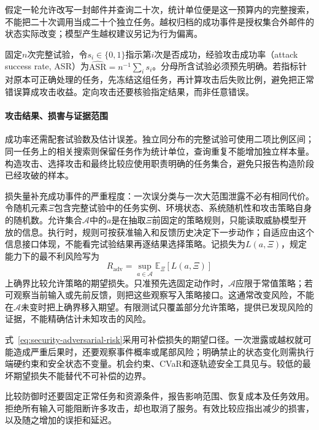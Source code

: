 假定一轮允许改写一封邮件并查询二十次，统计单位便是这一预算内的完整搜索，不能把二十次调用当成二十个独立任务。越权归档的成功事件是授权集合外邮件的状态实际改变；模型产生越权建议另记为行为偏离。

固定$n$次完整试验，令$s_i\in\{0,1\}$指示第$i$次是否成功，经验攻击成功率（attack success rate, ASR）为$\widehat{\mathrm{ASR}}=n^{-1}\sum_i s_i$。分母所含试验必须预先明确。若指标针对原本可正确处理的任务，先冻结这组任务，再计算攻击后失败比例，避免把正常错误算成攻击收益。定向攻击还要核验指定结果，而非任意错误。

\paragraph{攻击结果、损害与证据范围}

成功率还需配套试验数及估计误差。独立同分布的完整试验可使用二项比例区间；同一任务上的相关搜索则保留任务作为统计单位，查询重复不能增加独立样本量。构造攻击、选择攻击和最终比较应使用职责明确的任务集合，避免只报告构造阶段已经攻破的样本。

损失量补充成功事件的严重程度：一次误分类与一次大范围泄露不必有相同代价。令随机元素$\Xi$包含完整试验中的任务实例、环境状态、系统随机性和攻击策略自身的随机数。允许集合$\mathcal A$中的$a$是在抽取$\Xi$前固定的策略规则，只能读取威胁模型开放的信息。执行时，规则可按获准输入和反馈历史决定下一步动作；自适应由这个信息接口体现，不能看完试验结果再逐结果选择策略。记损失为$L(a,\Xi)$，规定能力下的最不利风险写为
\begin{equation}
 R_{\mathrm{adv}}=\sup_{a\in\mathcal A}
 \mathbb E_{\Xi}[L(a,\Xi)]
 \label{eq:security-adversarial-risk}
\end{equation}
上确界比较允许策略的期望损失。只准预先选固定动作时，$\mathcal A$应限于常值策略；若可观察当前输入或先前反馈，则把这些观察写入策略接口。这通常改变风险，不能在$\mathcal A$未变时把上确界移入期望。有限测试只覆盖部分允许策略，提供已发现风险的证据，不能精确估计未知攻击的风险。

式~\eqref{eq:security-adversarial-risk}采用可补偿损失的期望口径。一次泄露或越权就可能造成严重后果时，还要观察事件概率或尾部风险；明确禁止的状态变化则需执行端硬约束和安全状态不变量。机会约束、CVaR和逐轨迹安全工具见与。较低的最坏期望损失不能替代不可补偿的边界。

比较防御时还要固定正常任务和资源条件，报告影响范围、恢复成本及任务效用。拒绝所有输入可能阻断许多攻击，却也取消了服务。有效比较应指出减少的损害，以及随之增加的误拒和延迟。

